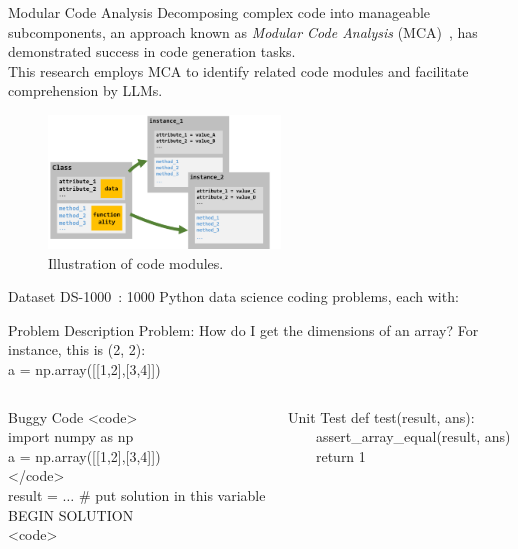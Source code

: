\begin{frame}{Modular Code Analysis}
    Decomposing complex code into manageable subcomponents, an approach known as \textit{Modular Code Analysis} (MCA)~\cite{le2023codechain}, has demonstrated success in code generation tasks.\\
    This research employs MCA to identify related code modules and facilitate comprehension by LLMs.
    \begin{figure}[!htb]
        \centering
        \includegraphics[width=0.55\textwidth]{img/class_diagram}
        \captionsetup{font=small,labelformat=empty}
        \caption{Illustration of code modules.}
    \end{figure}
\end{frame}

\begin{frame}{Dataset}
    DS-1000~\cite{pmlr-v202-lai23b}: 1000 Python data science coding problems, each with:
    \begin{block}{Problem Description}
        \small
        Problem:
        How do I get the dimensions of an array? For instance, this is (2, 2):\\
        a = np.array([[1,2],[3,4]])
    \end{block}

    \begin{columns}[T]
        \begin{column}{0.50\textwidth}
            \begin{block}{Buggy Code}
                \small
                <code>\\
                import numpy as np\\
                a = np.array([[1,2],[3,4]])\\
                </code>\\
                result = $\ldots$ \# put solution in this variable\\
                BEGIN SOLUTION\\
                <code>
            \end{block}
        \end{column}
        \begin{column}{0.45\textwidth}
            \begin{block}{Unit Test}
                \small
                def test(result, ans):\\
                \ \ \ \ assert\_array\_equal(result, ans)\\
                \ \ \ \ return 1
            \end{block}
        \end{column}
    \end{columns}
\end{frame}

